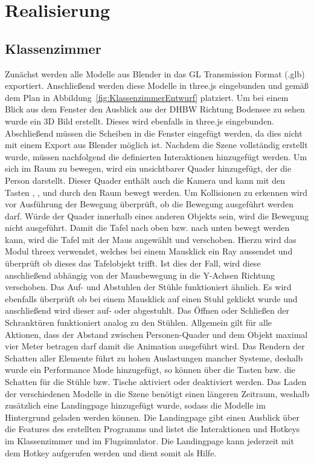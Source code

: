 \section{Realisierung}
\subsection{Klassenzimmer}
Zunächst werden alle Modelle aus Blender in das GL Transmission Format (.glb) exportiert.
Anschließend werden diese Modelle in three.js eingebunden und gemäß dem Plan in Abbildung~\ref{fig:KlassenzimmerEntwurf}
platziert.
Um bei einem Blick aus dem Fenster den Ausblick aus der DHBW Richtung Bodensee zu sehen wurde ein 3D Bild erstellt.
Dieses wird ebenfalls in three.js eingebunden.
Abschließend müssen die Scheiben in die Fenster eingefügt werden, da dies nicht mit einem Export aus Blender möglich ist.
\newparagraph
Nachdem die Szene vollständig erstellt wurde, müssen nachfolgend die definierten Interaktionen hinzugefügt werden.
Um sich im Raum zu bewegen, wird ein unsichtbarer Quader hinzugefügt, der die Person darstellt. Dieser Quader enthält auch die Kamera
und kann mit den Tasten , ,  und  durch den Raum bewegt werden. Um Kollisionen zu erkennen wird vor Ausführung der Bewegung überprüft,
ob die Bewegung ausgeführt werden darf. 
Würde der Quader innerhalb eines anderen Objekts sein, wird die Bewegung nicht ausgeführt.
\newparagraph
Damit die Tafel nach oben bzw. nach unten bewegt werden kann, wird die Tafel mit der Maus angewählt und verschoben.
Hierzu wird das Modul threex verwendet, welches bei einem Mausklick ein Ray aussendet und überprüft ob dieses das Tafelobjekt trifft.
Ist dies der Fall, wird diese anschließend abhängig von der Mausbewegung in die Y-Achsen Richtung verschoben.
Das Auf- und Abstuhlen der Stühle funktioniert ähnlich. Es wird ebenfalls überprüft ob bei einem Mausklick auf einen Stuhl geklickt wurde und anschließend wird dieser auf- oder abgestuhlt.
Das Öffnen oder Schließen der Schranktüren funktioniert analog zu den Stühlen.
Allgemein gilt für alle Aktionen, dass der Abstand zwischen Personen-Quader und dem Objekt maximal vier Meter betragen darf damit die Animation ausgeführt wird.
\newparagraph
Das Rendern der Schatten aller Elemente führt zu hohen Auslastungen mancher Systeme, deshalb wurde ein Performance Mode hinzugefügt, so können über die Tasten  bzw. 
die Schatten für die Stühle bzw. Tische aktiviert oder deaktiviert werden.
\newparagraph
Das Laden der verschiedenen Modelle in die Szene benötigt einen längeren Zeitraum, weshalb zusätzlich eine Landingpage hinzugefügt wurde, sodass die Modelle im Hintergrund geladen werden können.
Die Landingpage gibt einen Ausblick über die Features des erstellten Programms und listet die Interaktionen und Hotkeys im Klassenzimmer und im Flugsimulator.
Die Landingpage kann jederzeit mit dem Hotkey  aufgerufen werden und dient somit als Hilfe.
